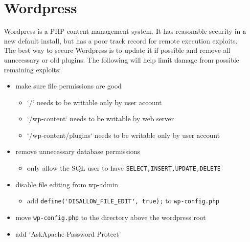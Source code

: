 \section{Wordpress}

Wordpress is a PHP content management system. It has reasonable security in a new default install, but has a poor track record for remote execution exploits. The best way to secure Wordpress is to update it if possible and remove all unnecessary or old plugins. The following will help limit damage from possible remaining exploits:

\begin{itemize}
	\item make sure file permissions are good
	\begin{itemize}
		\item `/` needs to be writable only by user account
		\item `/wp-content` needs to be writable by web server
		\item `/wp-content/plugins` needs to be writable only by user account
	\end{itemize}

	\item remove unnecessary database permissions
	\begin{itemize}
		\item only allow the SQL user to have \lstinline|SELECT,INSERT,UPDATE,DELETE|
	\end{itemize}

	\item disable file editing from wp-admin
	\begin{itemize}
		\item add \lstinline|define('DISALLOW_FILE_EDIT', true);| to \lstinline|wp-config.php|
	\end{itemize}

	\item move \lstinline|wp-config.php| to the directory above the wordpress root

	\item add 'AskApache Password Protect'
\end{itemize}
